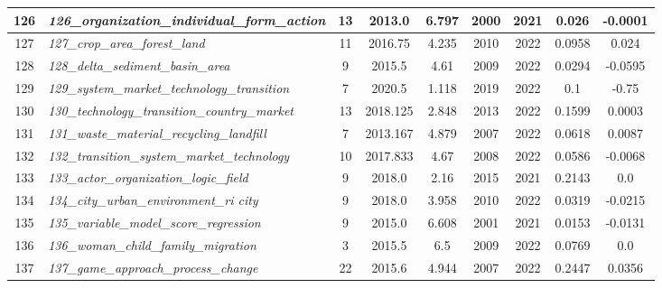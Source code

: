 \documentclass[12pt]{article}
\begin{document}
\begin{landscape}
\begin{scriptsize}
\begin{longtable}{|>{\scriptsize}c|p{6cm}|c|c|c|c|c|c|c|}
126 & \textit{126\_organization\_individual\_form\_action} & 13 & 2013.0 & 6.797 & 2000 & 2021 & 0.026 & -0.0001 \\ \hline
127 & \textit{127\_crop\_area\_forest\_land} & 11 & 2016.75 & 4.235 & 2010 & 2022 & 0.0958 & 0.024 \\ \hline
128 & \textit{128\_delta\_sediment\_basin\_area} & 9 & 2015.5 & 4.61 & 2009 & 2022 & 0.0294 & -0.0595 \\ \hline
129 & \textit{129\_system\_market\_technology\_transition} & 7 & 2020.5 & 1.118 & 2019 & 2022 & 0.1 & -0.75 \\ \hline
130 & \textit{130\_technology\_transition\_country\_market} & 13 & 2018.125 & 2.848 & 2013 & 2022 & 0.1599 & 0.0003 \\ \hline
131 & \textit{131\_waste\_material\_recycling\_landfill} & 7 & 2013.167 & 4.879 & 2007 & 2022 & 0.0618 & 0.0087 \\ \hline
132 & \textit{132\_transition\_system\_market\_technology} & 10 & 2017.833 & 4.67 & 2008 & 2022 & 0.0586 & -0.0068 \\ \hline
133 & \textit{133\_actor\_organization\_logic\_field} & 9 & 2018.0 & 2.16 & 2015 & 2021 & 0.2143 & 0.0 \\ \hline
134 & \textit{134\_city\_urban\_environment\_ri city} & 9 & 2018.0 & 3.958 & 2010 & 2022 & 0.0319 & -0.0215 \\ \hline
135 & \textit{135\_variable\_model\_score\_regression} & 9 & 2015.0 & 6.608 & 2001 & 2021 & 0.0153 & -0.0131 \\ \hline
136 & \textit{136\_woman\_child\_family\_migration} & 3 & 2015.5 & 6.5 & 2009 & 2022 & 0.0769 & 0.0 \\ \hline
137 & \textit{137\_game\_approach\_process\_change} & 22 & 2015.6 & 4.944 & 2007 & 2022 & 0.2447 & 0.0356 \\ \hline
\end{longtable}
\end{scriptsize} %
\end{landscape}
\end{document}

